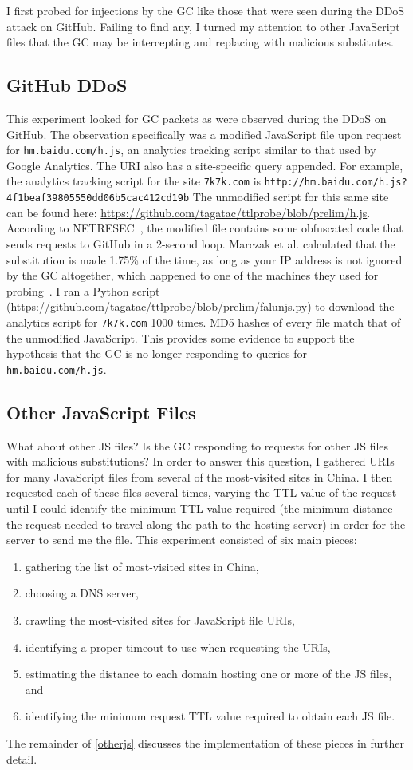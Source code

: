 I first probed for injections by the GC like those that were seen during the DDoS attack on GitHub.
Failing to find any, I turned my attention to other JavaScript files that the GC may be intercepting and replacing with malicious substitutes.
\subsection{GitHub DDoS}
This experiment looked for GC packets as were observed during the DDoS on GitHub.
The observation specifically was a modified JavaScript file upon request for \texttt{hm.baidu.com/h.js}, an analytics tracking script similar to that used by Google Analytics.
The URI also has a site-specific query appended.
For example, the analytics tracking script for the site \texttt{7k7k.com} is \texttt{http://hm.baidu.com/\allowbreak h.js?4f1beaf39805550dd06b5cac412cd19b}
The unmodified script for this same site can be found here: \url{https://github.com/tagatac/ttlprobe/blob/prelim/h.js}.
According to \mbox{NETRESEC}~\cite{Hjelmvik2015}, the modified file contains some obfuscated code that sends requests to GitHub in a 2-second loop.
Marczak et al. calculated that the substitution is made 1.75\% of the time, as long as your IP address is not ignored by the GC altogether, which happened to one of the machines they used for probing~\cite{Marczak2015}.
I ran a Python script (\url{https://github.com/tagatac/ttlprobe/blob/prelim/falunjs.py}) to download the analytics script for \texttt{7k7k.com} 1000 times.
MD5 hashes of every file match that of the unmodified JavaScript.
This provides some evidence to support the hypothesis that the GC is no longer responding to queries for \texttt{hm.baidu.com/h.js}.
\subsection{Other JavaScript Files}\label{otherjs}
What about other JS files?
Is the GC responding to requests for other JS files with malicious substitutions?
In order to answer this question, I gathered URIs for many JavaScript files from several of the most-visited sites in China.
I then requested each of these files several times, varying the TTL value of the request until I could identify the minimum TTL value required (the minimum distance the request needed to travel along the path to the hosting server) in order for the server to send me the file.
This experiment consisted of six main pieces:
\begin{enumerate}\addtolength{\itemsep}{-.35\baselineskip}
	\item gathering the list of most-visited sites in China,
	\item choosing a DNS server,
	\item crawling the most-visited sites for JavaScript file URIs,
	\item identifying a proper timeout to use when requesting the URIs,
	\item estimating the distance to each domain hosting one or more of the JS files, and
	\item identifying the minimum request TTL value required to obtain each JS file.
\end{enumerate}
The remainder of \autoref{otherjs} discusses the implementation of these pieces in further detail.
